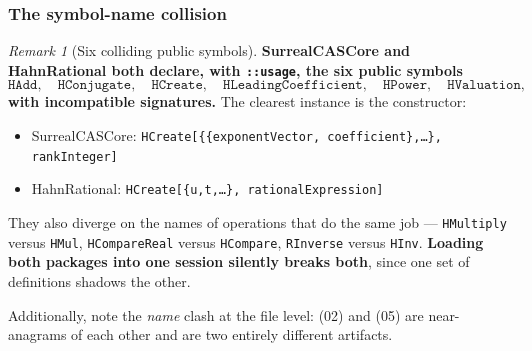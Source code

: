\documentclass[11pt,letterpaper]{article}
\numberwithin{equation}{section}
\theoremstyle{definition}
\theoremstyle{remark}
\newtheorem{remark}[theorem]{Remark}
\begin{document}
\subsubsection{The symbol-name collision}
\label{cas:subsub-collision}
\begin{remark}[Six colliding public symbols]\label{cas:rem-symbolcollision}
\textbf{SurrealCASCore and HahnRational both declare, with \texttt{::usage},
the six public symbols}
\[
 \texttt{HAdd},\quad \texttt{HConjugate},\quad \texttt{HCreate},\quad
 \texttt{HLeadingCoefficient},\quad \texttt{HPower},\quad \texttt{HValuation},
\]
\textbf{with incompatible signatures.} The clearest instance is the
constructor:
\begin{itemize}
\item SurrealCASCore:
\texttt{HCreate[\{\{exponentVector, coefficient\},\dots\}, rankInteger]}
\item HahnRational:
\texttt{HCreate[\{u,t,\dots\}, rationalExpression]}
\end{itemize}
They also
diverge on the names of operations that do the same job ---
\texttt{HMultiply} versus \texttt{HMul}, \texttt{HCompareReal} versus
\texttt{HCompare}, \texttt{RInverse} versus \texttt{HInv}.
\textbf{Loading both packages into one session silently breaks both}, since one
set of definitions shadows the other.

Additionally, note the \emph{name} clash at the file level:
 (02) and  (05) are near-anagrams of
each other and are two entirely different artifacts.
\end{remark}
\end{document}
